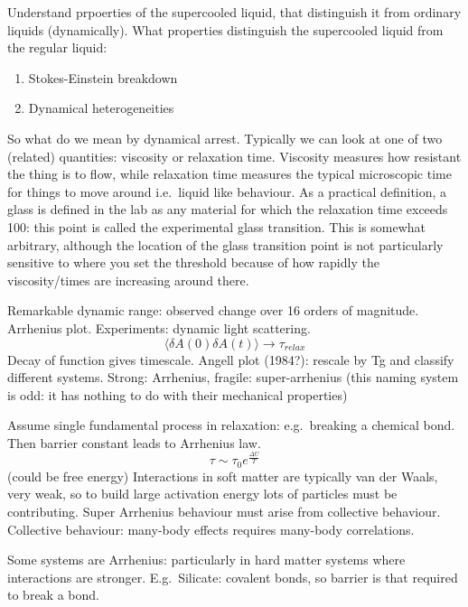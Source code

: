 Understand prpoerties of the supercooled liquid, that distinguish it from ordinary liquids (dynamically).
What properties distinguish the supercooled liquid from the regular liquid:
\begin{enumerate}
\item Stokes-Einstein breakdown
\item Dynamical heterogeneities
\end{enumerate}

So what do we mean by dynamical arrest.
Typically we can look at one of two (related) quantities: viscosity or relaxation time.
Viscosity measures how resistant the thing is to flow, while relaxation time measures the typical microscopic time for things to move around i.e.\ liquid like behaviour.
As a practical definition, a glass is defined in the lab as any material for which the relaxation time exceeds 100: this point is called the experimental glass transition.
This is somewhat arbitrary, although the location of the glass transition point is not particularly sensitive to where you set the threshold because of how rapidly the viscosity/times are increasing around there.

Remarkable dynamic range: observed change over 16 orders of magnitude.
Arrhenius plot.
Experiments: dynamic light scattering.
\begin{equation}
  \langle \delta A(0) \delta A(t) \rangle
  \to \tau_{relax}
\end{equation}
Decay of function gives timescale.
Angell plot (1984?): rescale by Tg and classify different systems.
Strong: Arrhenius, fragile: super-arrhenius (this naming system is odd: it has nothing to do with their mechanical properties)

Assume single fundamental process in relaxation: e.g.\ breaking a chemical bond.
Then barrier constant leads to Arrhenius law.
\begin{equation}
  \tau \sim \tau_0 e^{\frac{\Delta U}{T}}
\end{equation}
(could be free energy)
Interactions in soft matter are typically van der Waals, very weak, so to build large activation energy lots of particles must be contributing.
Super Arrhenius behaviour must arise from collective behaviour.
Collective behaviour: many-body effects requires many-body correlations.

Some systems are Arrhenius: particularly in hard matter systems where interactions are stronger.
E.g.\ Silicate: covalent bonds, so barrier is that required to break a bond.

